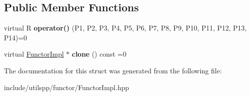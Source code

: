 \subsection*{Public Member Functions}
\begin{DoxyCompactItemize}
\item 
\hypertarget{structutilspp_1_1FunctorImpl_3_01R_00_01TYPE__LIST__14_07P1_00_01P2_00_01P3_00_01P4_00_01P5_00_068b9945896861b079e861dc8bbcfbe94_a852ce71eb8a2e6adfc5a7ff27df5fd84}{virtual R {\bfseries operator()} (P1, P2, P3, P4, P5, P6, P7, P8, P9, P10, P11, P12, P13, P14)=0}\label{structutilspp_1_1FunctorImpl_3_01R_00_01TYPE__LIST__14_07P1_00_01P2_00_01P3_00_01P4_00_01P5_00_068b9945896861b079e861dc8bbcfbe94_a852ce71eb8a2e6adfc5a7ff27df5fd84}

\item 
\hypertarget{structutilspp_1_1FunctorImpl_3_01R_00_01TYPE__LIST__14_07P1_00_01P2_00_01P3_00_01P4_00_01P5_00_068b9945896861b079e861dc8bbcfbe94_aa0713e401193291caa187a792d10e7a9}{virtual \hyperlink{structutilspp_1_1FunctorImpl}{Functor\-Impl} $\ast$ {\bfseries clone} () const =0}\label{structutilspp_1_1FunctorImpl_3_01R_00_01TYPE__LIST__14_07P1_00_01P2_00_01P3_00_01P4_00_01P5_00_068b9945896861b079e861dc8bbcfbe94_aa0713e401193291caa187a792d10e7a9}

\end{DoxyCompactItemize}


The documentation for this struct was generated from the following file\-:\begin{DoxyCompactItemize}
\item 
include/utilspp/functor/Functor\-Impl.\-hpp\end{DoxyCompactItemize}
